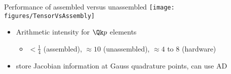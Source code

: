 \begin{frame}[shrink=5]{Performance of assembled versus unassembled}
  \vspace{1ex}
  \texttt{[image: figures/TensorVsAssembly]} \\
  \begin{itemize}
  \item Arithmetic intensity for $\Qk p$ elements
    \begin{itemize}
    \item $< \frac 1 4$ (assembled), $\approx 10$ (unassembled), $\approx 4$ to $8$ (hardware)
    \end{itemize}
  \item store Jacobian information at Gauss quadrature points, can use AD
  \end{itemize}
\end{frame}
